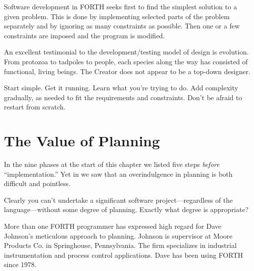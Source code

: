 \begin{tfquot}
Software development in FORTH seeks first to find the simplest solution
to a given problem. This is done by implementing selected parts of the
problem separately and by ignoring as many constraints as possible. Then one
or a few constraints are imposed and the program is modified.
\end{tfquot}
An excellent testimonial to the development/testing model of design is
evolution. From protozoa to tadpoles to people, each species along the
way has consisted of functional, living beings. The Creator does not
appear to be a top-down designer.

\begin{tip}
Start simple. Get it running. Learn what you're trying to do. Add
complexity gradually, as needed to fit the requirements and
constraints. Don't be afraid to restart from scratch.
\end{tip}

\section{The Value of Planning}

In the nine phases at the start of this chapter we listed five steps
\emph{before} ``implementation.'' Yet in  we saw that an
overindulgence in planning is both difficult and pointless.

Clearly you can't undertake a significant software
project---regardless of the language---without some degree of planning.
Exactly what degree is appropriate?

\bigskip\blackline{2ex}
\noindent More than one FORTH programmer has expressed high regard for Dave
Johnson's meticulous approach to planning. Johnson is supervisor at
Moore Products Co. in Springhouse, Pennsylvania. The firm specializes
in industrial instrumentation and process control applications. Dave has
been using FORTH since 1978.

